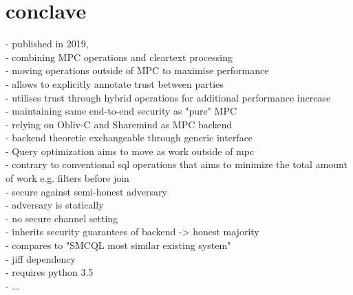 \section{conclave}
- published in 2019,\\
- combining MPC operations and cleartext processing\\ 
- moving operations outside of MPC to maximise performance\\
- allows to explicitly annotate trust between parties\\
- utilises trust through hybrid operations for additional performance increase \\
- maintaining same end-to-end security as "pure" MPC     \\
- relying on Obliv-C and Sharemind as MPC backend\\
- backend theoretic exchangeable through generic interface\\

- Query optimization aims to move as work outside of mpc\\
- contrary to conventional sql operations that aims to minimize the total amount of work e.g. filters before join \\

- secure against semi-honest adversary \\
- adversary is statically\\
- no secure channel setting\\
- inherits security guarantees of backend -> honest majority \\
- compares to "SMCQL most similar existing system"\\
- jiff dependency \\
- requires python 3.5 \\
- ...